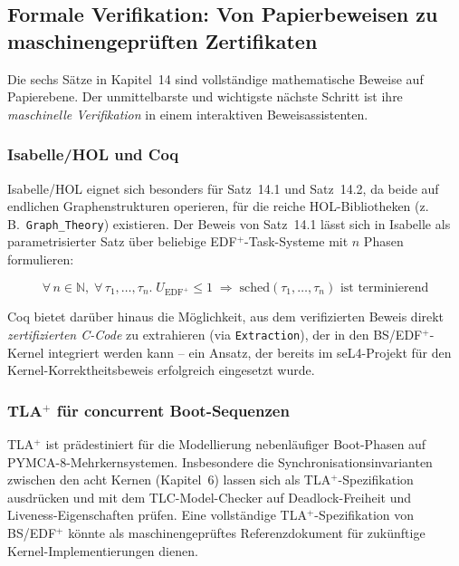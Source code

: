 ﻿\documentclass[a4paper,12pt]{scrreprt}
\theoremstyle{definition}
\begin{document}
	\subsection{Formale Verifikation: Von Papierbeweisen zu maschinengeprüften Zertifikaten}
	
	Die sechs Sätze in Kapitel~14 sind vollständige mathematische Beweise auf
	Papierebene. Der unmittelbarste und wichtigste nächste Schritt ist ihre
	\emph{maschinelle Verifikation} in einem interaktiven Beweisassistenten.
	
	\subsubsection{Isabelle/HOL und Coq}
	
	Isabelle/HOL \cite{Nipkow2002} eignet sich besonders für Satz~14.1 und
	Satz~14.2, da beide auf endlichen Graphenstrukturen operieren, für die
	reiche HOL-Bibliotheken (z.\,B.\ \texttt{Graph\_Theory}) existieren.
	Der Beweis von Satz~14.1 lässt sich in Isabelle als parametrisierter
	Satz über beliebige EDF$^+$-Task-Systeme mit $n$ Phasen formulieren:
	
	\[
	\forall\, n \in \mathbb{N},\; \forall\,\tau_1,\ldots,\tau_n.\;
	U_{\mathrm{EDF}^+} \le 1 \;\Longrightarrow\;
	\text{sched}(\tau_1,\ldots,\tau_n) \text{ ist terminierend}
	\]
	
	Coq bietet darüber hinaus die Möglichkeit, aus dem verifizierten Beweis
	direkt \emph{zertifizierten C-Code} zu extrahieren (via \texttt{Extraction}),
	der in den BS/EDF$^+$-Kernel integriert werden kann -- ein Ansatz, der
	bereits im seL4-Projekt \cite{Klein2009} für den Kernel-Korrektheitsbeweis
	erfolgreich eingesetzt wurde.
	
	\subsubsection{TLA\texorpdfstring{$^+$}{+} für concurrent Boot-Sequenzen}
	
	TLA$^+$ \cite{Lamport2002} ist prädestiniert für die Modellierung
	nebenläufiger Boot-Phasen auf PYMCA-8-Mehrkern\-systemen. Insbesondere
	die Synchronisationsinvarianten zwischen den acht Kernen (Kapitel~6) lassen
	sich als TLA$^+$-Spezifikation ausdrücken und mit dem TLC-Model-Checker
	auf Deadlock-Freiheit und Liveness-Eigenschaften prüfen. Eine vollständige
	TLA$^+$-Spezifikation von BS/EDF$^+$ könnte als maschinengeprüftes
	Referenzdokument für zukünftige Kernel-Implementierungen dienen.
	
\end{document}
